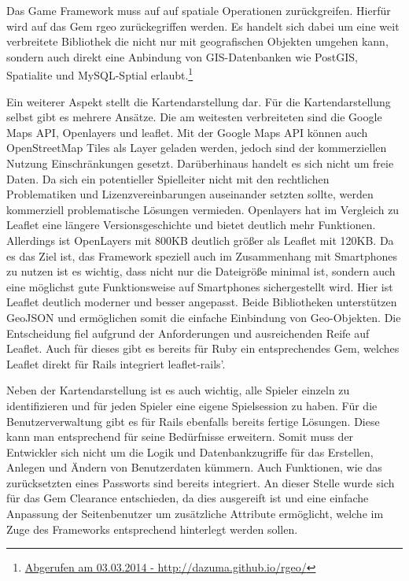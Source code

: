 Das Game Framework muss auf auf spatiale Operationen zurückgreifen. Hierfür wird auf das Gem \glqq rgeo\grqq{} zurückegriffen werden. Es handelt sich dabei um eine weit verbreitete Bibliothek die nicht nur mit geografischen Objekten umgehen kann, sondern auch direkt eine Anbindung von GIS-Datenbanken wie PostGIS, Spatialite und MySQL-Sptial erlaubt.\footnote{\url{Abgerufen am 03.03.2014 - http://dazuma.github.io/rgeo/}}

Ein weiterer Aspekt stellt die Kartendarstellung dar. Für die Kartendarstellung selbst gibt es mehrere Ansätze. Die am weitesten verbreiteten sind die Google Maps API, Openlayers und leaflet.\cite{Derrough.2013} Mit der Google Maps API können auch OpenStreetMap Tiles als Layer geladen werden, jedoch sind der kommerziellen Nutzung Einschränkungen gesetzt. Darüberhinaus handelt es sich nicht um freie Daten. Da sich ein potentieller Spielleiter nicht mit den rechtlichen Problematiken und Lizenzvereinbarungen auseinander setzten sollte, werden kommerziell problematische Lösungen vermieden. Openlayers hat im Vergleich zu Leaflet eine längere Versionsgeschichte und bietet deutlich mehr Funktionen.\cite{Ohloh.2014} Allerdings ist OpenLayers mit 800KB deutlich größer als Leaflet mit 120KB. Da es das Ziel ist, das Framework speziell auch im Zusammenhang mit Smartphones zu nutzen ist es wichtig, dass nicht nur die Dateigröße minimal ist, sondern auch eine möglichst gute Funktionsweise auf Smartphones sichergestellt wird. Hier ist Leaflet deutlich moderner und besser angepasst. Beide Bibliotheken unterstützen GeoJSON und ermöglichen somit die einfache Einbindung von Geo-Objekten. Die Entscheidung fiel aufgrund der Anforderungen und ausreichenden Reife auf Leaflet. Auch für dieses gibt es bereits für Ruby ein entsprechendes Gem, welches Leaflet direkt für Rails integriert \glqq leaflet-rails'.

Neben der Kartendarstellung ist es auch wichtig, alle Spieler einzeln zu identifizieren und für jeden Spieler eine eigene \glqq Spielsession\grqq{} zu haben. Für die Benutzerverwaltung gibt es für Rails ebenfalls bereits fertige Lösungen. Diese kann man entsprechend für seine Bedürfnisse erweitern. Somit muss der Entwickler sich nicht um die Logik und Datenbankzugriffe für das Erstellen, Anlegen und Ändern von Benutzerdaten kümmern. Auch Funktionen, wie das zurücksetzten eines Passworts sind bereits integriert. An dieser Stelle wurde sich für das Gem \glqq Clearance\grqq{} entschieden, da dies ausgereift ist und eine einfache Anpassung der Seitenbenutzer um zusätzliche Attribute ermöglicht, welche im Zuge des Frameworks entsprechend hinterlegt werden sollen.

